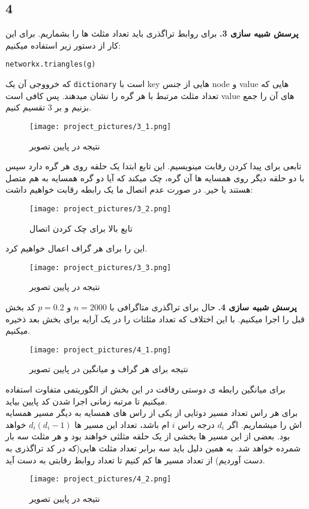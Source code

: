 \documentclass[11pt]{article}
\begin{document}
\begin{persian}
\section*{4}
\textbf{پرسش شبیه سازی 3.}
برای روابط تراگذری باید تعداد مثلث ها را بشماریم. برای این کار از دستور زیر استفاده میکنیم:
\begin{latin}
\lstset{language=python}
\begin{lstlisting}
networkx.triangles(g)
\end{lstlisting}
\end{latin}
که خرووجی آن یک
\texttt{dictionary}
است با key  هایی از جنس node و value هایی که تعداد مثلث مرتبط با هر گره را نشان میدهند. پس کافی است value های آن را جمع بزنیم و بر 3 تقسیم کنیم.
\begin{figure}[H]
\centerline{\texttt{[image: project\_pictures/3\_1.png]}}
\caption{نتیجه در پایین تصویر }
\end{figure}  
تابعی برای پیدا کردن رقابت مینویسیم. این تابع ابتدا یک حلقه روی هر گره دارد سپس با دو حلقه دیگر روی همسایه ها آن گره، چک میکند که آیا دو گره همسایه به هم متصل هستند یا خیر. در صورت عدم اتصال ما یک رابطه رقابت خواهیم داشت:
\begin{figure}[H]
\centerline{\texttt{[image: project\_pictures/3\_2.png]}}
\caption{تابع بالا برای چک کردن اتصال }
\end{figure}  
این را برای هر گراف اعمال خواهیم کرد.
\begin{figure}[H]
\centerline{\texttt{[image: project\_pictures/3\_3.png]}}
\caption{نتیجه در پایین تصویر }
\end{figure}  

\textbf{پرسش شبیه سازی 4.}
حال برای تراگذری متاگرافی با 
$n=2000$
و 
$p=0.2$
کد بخش قبل را اجرا میکنیم. با این اختلاف که تعداد مثلثات را در یک آرایه برای بخش بعد ذخیره میکنیم.
\begin{figure}[H]
\centerline{\texttt{[image: project\_pictures/4\_1.png]}}
\caption{نتیجه برای هر گراف و میانگین در پایین تصویر }
\end{figure}  
برای میانگین رابطه ی دوستی رفاقت در این بخش از الگوریتمی متفاوت استفاده میکنیم تا مرتبه زمانی اجرا شدن کد پایین بیاید. \\
برای هر راس تعداد مسیر دوتایی از یکی از راس های همسایه به دیگر مسیر همسایه اش را میشماریم. اگر $d_i$ درجه راس  $i$ ام باشد، تعداد این مسیر ها 
$d_i(d_i-1)$
خواهد بود. بعضی از این مسیر ها بخشی از یک حلقه مثلثی خواهند بود و هر مثلث سه بار شمرده خواهد شد. به همین دلیل باید سه برابر تعداد مثلث هایی(که در کد تراگذری به دست آوردیم) از تعداد مسیر ها کم کنیم تا تعداد روابط رقابتی به دست آید.
\begin{figure}[H]
\centerline{\texttt{[image: project\_pictures/4\_2.png]}}
\caption{نتیجه در پایین تصویر }
\end{figure} 


\end{persian}
\end{document}
